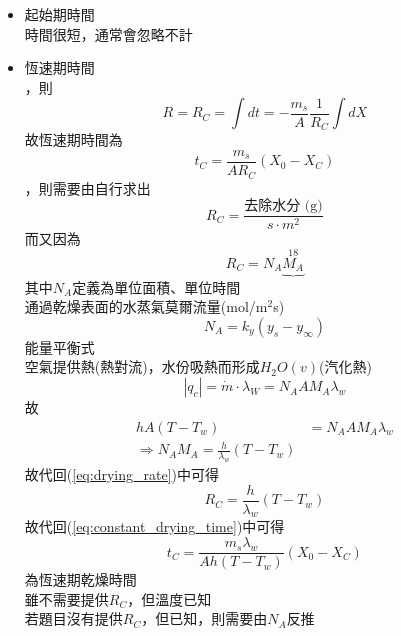 \documentclass[../main.tex]{subfiles}
\begin{document}
\begin{itemize}
\begin{itemize}
    各階段乾燥時間之和
    \item 起始期時間\\
    時間很短，通常會忽略不計
    \item 恆速期時間\\
    ，則
    \begin{equation}
      R = R_C = \int dt = -\frac{m_s}{A}\frac{1}{R_C}\int dX
    \end{equation}
    故恆速期時間為
    \begin{equation}
      \boxed{t_C = \frac{m_s}{A R_C}(X_0 - X_C)} \label{eq:constant_drying_time}
    \end{equation}
    ，則需要由自行求出
    \begin{equation}
      R_C = \frac{\text{去除水分 (g)}}{s\cdot m^2}
    \end{equation}
    而又因為
    \begin{equation}
      R_C = N_A\underbrace{M_A}^{18} \label{eq:drying_rate}
    \end{equation}
    其中$N_A$定義為單位面積、單位時間\\
    通過乾燥表面的水蒸氣莫爾流量(mol/m$^2$s)
    \begin{equation}
      N_A = k_y (y_s - y_\infty)
    \end{equation}
    能量平衡式\\
    空氣提供熱(熱對流)，水份吸熱而形成$H_2O(v)$(汽化熱)
    \begin{equation}
      |q_c|  = \dot m \cdot \lambda_W =  N_A A M_A \lambda_w
    \end{equation}
    故
    \begin{align}
      hA(T-T_w) &= N_A A M_A \lambda_w \\
      \Rightarrow N_AM_A = \frac{h}{\lambda_w}(T - T_w)
    \end{align}
    故代回(\ref{eq:drying_rate})中可得
    \begin{equation}
      \boxed{R_C = \frac{h}{\lambda_w}(T - T_w)} 
    \end{equation}
    故代回(\ref{eq:constant_drying_time})中可得
    \begin{equation}
      \boxed{t_C = \frac{m_s \lambda_w}{A h (T - T_w)}(X_0 - X_C)}
    \end{equation}
    為恆速期乾燥時間\\
    雖不需要提供$R_C$，但溫度已知\bigskip\\
    若題目沒有提供$R_C$，但已知，則需要由$N_A$反推
    \begin{equation}

\end{equation}
\end{itemize}
\end{itemize}
\end{document}
